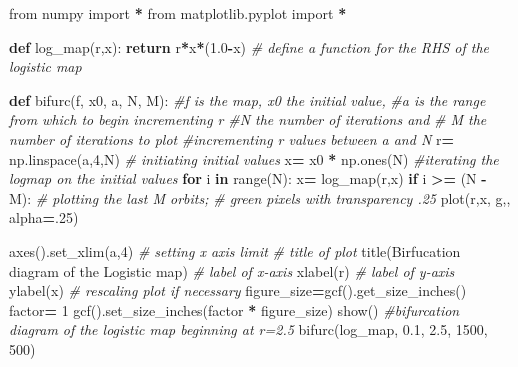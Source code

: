 \documentclass[
  a4paper,
  oneside,
  final]{krantz}
\newenvironment{Shaded}{\begin{snugshade}}{\end{snugshade}}
\newcommand{\BuiltInTok}[1]{#1}
\newcommand{\CommentTok}[1]{\textcolor[rgb]{0.56,0.35,0.01}{\textit{#1}}}
\newcommand{\ControlFlowTok}[1]{\textcolor[rgb]{0.13,0.29,0.53}{\textbf{#1}}}
\newcommand{\DecValTok}[1]{\textcolor[rgb]{0.00,0.00,0.81}{#1}}
\newcommand{\FloatTok}[1]{\textcolor[rgb]{0.00,0.00,0.81}{#1}}
\newcommand{\ImportTok}[1]{#1}
\newcommand{\KeywordTok}[1]{\textcolor[rgb]{0.13,0.29,0.53}{\textbf{#1}}}
\newcommand{\NormalTok}[1]{#1}
\newcommand{\OperatorTok}[1]{\textcolor[rgb]{0.81,0.36,0.00}{\textbf{#1}}}
\newcommand{\StringTok}[1]{\textcolor[rgb]{0.31,0.60,0.02}{#1}}
\theoremstyle{definition}
\theoremstyle{definition}
\theoremstyle{definition}
\theoremstyle{definition}
\theoremstyle{remark}
\begin{document}
\begin{Shaded}
\begin{Highlighting}[]

\ImportTok{from}\NormalTok{ numpy }\ImportTok{import} \OperatorTok{*}
\ImportTok{from}\NormalTok{ matplotlib.pyplot }\ImportTok{import} \OperatorTok{*}

\KeywordTok{def}\NormalTok{ log\_map(r,x):}
        \ControlFlowTok{return}\NormalTok{ r}\OperatorTok{*}\NormalTok{x}\OperatorTok{*}\NormalTok{(}\FloatTok{1.0}\OperatorTok{{-}}\NormalTok{x) }
\CommentTok{\# define a function for the RHS of the logistic map}


\KeywordTok{def}\NormalTok{ bifurc(f, x0, a, N, M):}
\CommentTok{\#f is the map, x0 the initial value,}
\CommentTok{\#a is the range from which to begin incrementing r }
\CommentTok{\#N the number of iterations and}
\CommentTok{\# M the number of iterations to plot}
        \CommentTok{\#incrementing r values between a and N}
\NormalTok{        r}\OperatorTok{=}\NormalTok{ np.linspace(a,}\DecValTok{4}\NormalTok{,N)}
        \CommentTok{\# initiating initial values }
\NormalTok{        x}\OperatorTok{=}\NormalTok{ x0 }\OperatorTok{*}\NormalTok{ np.ones(N) }
        \CommentTok{\#iterating the logmap on the initial values}
        \ControlFlowTok{for}\NormalTok{ i }\KeywordTok{in} \BuiltInTok{range}\NormalTok{(N):  }
\NormalTok{            x}\OperatorTok{=}\NormalTok{ log\_map(r,x)}
            \ControlFlowTok{if}\NormalTok{ i }\OperatorTok{\textgreater{}=}\NormalTok{ (N }\OperatorTok{{-}}\NormalTok{ M):}
                \CommentTok{\# plotting the last M orbits;}
                \CommentTok{\# green pixels with transparency .25}
\NormalTok{                plot(r,x, }\StringTok{\textquotesingle{}g,\textquotesingle{}}\NormalTok{, alpha}\OperatorTok{=}\FloatTok{.25}\NormalTok{)  }

\NormalTok{        axes().set\_xlim(a,}\DecValTok{4}\NormalTok{) }\CommentTok{\# setting x axis limit }
        \CommentTok{\# title of plot}
\NormalTok{        title(}\StringTok{\textquotesingle{}Birfucation diagram of the Logistic map\textquotesingle{}}\NormalTok{)}
        \CommentTok{\# label of x{-}axis  }
\NormalTok{        xlabel(}\StringTok{\textquotesingle{}r\textquotesingle{}}\NormalTok{)  }
        \CommentTok{\# label of y{-}axis                              }
\NormalTok{        ylabel(}\StringTok{\textquotesingle{}x\textquotesingle{}}\NormalTok{)           }
        \CommentTok{\# rescaling plot if necessary                     }
\NormalTok{        figure\_size}\OperatorTok{=}\NormalTok{gcf().get\_size\_inches() }
\NormalTok{        factor}\OperatorTok{=} \DecValTok{1}
\NormalTok{        gcf().set\_size\_inches(factor }\OperatorTok{*}\NormalTok{ figure\_size)}
\NormalTok{        show()}
\CommentTok{\#bifurcation diagram of the logistic map beginning at r=2.5}
\NormalTok{bifurc(log\_map, }\FloatTok{0.1}\NormalTok{, }\FloatTok{2.5}\NormalTok{, }\DecValTok{1500}\NormalTok{, }\DecValTok{500}\NormalTok{) }
\end{Highlighting}
\end{Shaded}
\end{document}
